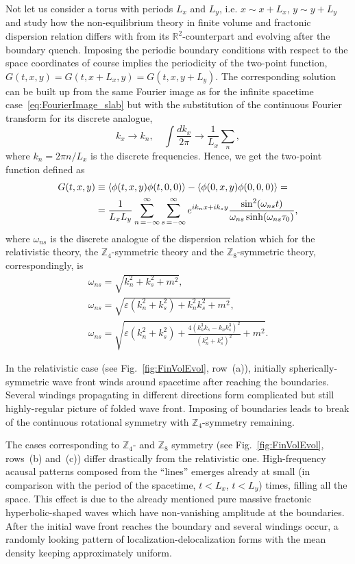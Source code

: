 \documentclass[a4paper,12pt]{article}
\newcommand{\be}{\begin{equation}}
\newcommand{\ee}{\end{equation}}
\newcommand{\skipline}{\vspace{\baselineskip}}
\DeclarePairedDelimiter\corrfunc{\langle}{\rangle}
\newcommand{\eps}{\varepsilon}
\newcommand{\om}{\omega}
\newcommand{\Z}[1]{\mathbb{Z}_{#1}}
\newcommand{\figref}[1]{Fig.~\ref{#1}}
\begin{document}
Not let us consider a torus with periods $L_x$ and $L_y$, i.e. $x \sim x + L_x$, $y \sim y + L_y$ and study how the non-equilibrium theory in finite volume and fractonic dispersion relation differs with from its $\mathbb{R}^2$-counterpart and evolving after the boundary quench. Imposing the periodic boundary conditions with respect to the space coordinates of course implies the periodicity of the two-point function, $G(t, x, y) = G(t, x + L_x, y) = G(t, x, y + L_y)$. The corresponding solution can be built up from the same Fourier image as for the infinite spacetime case~\eqref{eq:FourierImage_slab} but with the substitution of the continuous Fourier transform for its discrete analogue,
\be
    k_x \to k_n, \quad \int\frac{dk_x}{2\pi} \to \frac{1}{L_x}\sum_n,
\ee
where $k_n = 2\pi n/L_x$ is the discrete frequencies. Hence, we get the two-point function defined as
\be
    \begin{aligned}
        G(t, x, y) & \equiv \corrfunc{\phi(t, x, y)\phi(t, 0, 0)} - \corrfunc{\phi(0, x, y)\phi(0, 0, 0)} = \\ 
        & = \frac{1}{L_x L_y}\sum_{n\,= -\infty}^{\infty}\sum_{s\,= -\infty}^{\infty} e^{ik_n x + ik_s y}\frac{\sin^2(\om_{ns} t)}{\om_{ns}\sinh(\om_{ns}\tau_0)},
    \end{aligned}
    \label{eq:G_slab_finvol}
\ee
where $\om_{ns}$ is the discrete analogue of the dispersion relation which for the relativistic theory, the $\Z4$-symmetric theory and the $\Z8$-symmetric theory, correspondingly, is
\begin{gather}
    \om_{ns} = \sqrt{k_n^2 + k_s^2 + m^2}, \\
    \om_{ns} = \sqrt{\eps(k_n^2 + k_s^2) + k_n^2 k_s^2 + m^2}, \\
    \om_{ns} = \sqrt{\eps(k_n^2 + k_s^2) + \frac{4\left(k_n^3 k_s - k_n k_s^3\right)^2}{\left(k_n^2 + k_s^2\right)^2} + m^2}.
\end{gather}

\skipline

In the relativistic case (see \figref{fig:FinVolEvol}, row~(a)), initially spherically-symmetric wave front winds around spacetime after reaching the boundaries. Several windings propagating in different directions form complicated but still highly-regular picture of folded wave front. Imposing of boundaries leads to break of the continuous rotational symmetry with $\Z4$-symmetry remaining.

\skipline

The cases corresponding to $\Z4$- and $\Z8$ symmetry (see \figref{fig:FinVolEvol}, rows~(b) and~(c)) differ drastically from the relativistic one. High-frequency acausal patterns composed from the ``lines'' emerges already at small (in comparison with the period of the spacetime, $t < L_x$, $t < L_y$) times, filling all the space. This effect is due to the already mentioned pure massive fractonic hyperbolic-shaped waves which have non-vanishing amplitude at the boundaries. After the initial wave front reaches the boundary and several windings occur, a randomly looking pattern of localization-delocalization forms with the mean density keeping approximately uniform.
\end{document}

